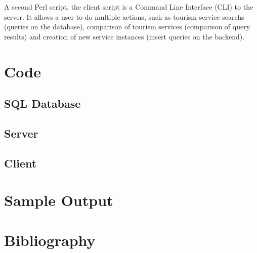 \documentclass[a4paper,12pt]{article}
\begin{document}
A second Perl script, the client script is a Command Line Interface 
(CLI) to the server. It allows a user to do multiple actions, such as
tourism service searchs (queries on the database), comparison of tourism 
services (comparison of query results) and creation of new service
instances (insert queries on the backend).

\section{Code}

\subsection{SQL Database}

\subsection{Server}

\subsection{Client}

\section{Sample Output}

\section{Bibliography}
\end{document}
